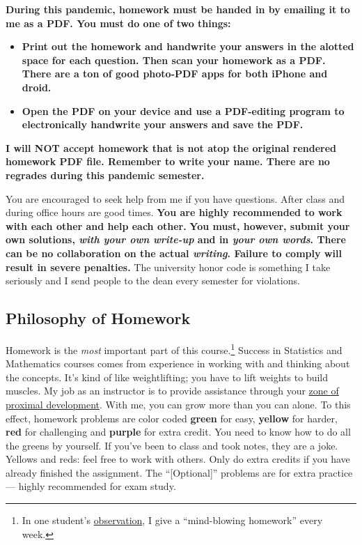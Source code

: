 \documentclass[12pt]{article}
\newcommand{\ingreen}[1]{\color{green}\textbf{#1} \color{black}}
\newcommand{\inyellow}[1]{\color{yellow}\textbf{#1} \color{black}}
\newcommand{\inred}[1]{\color{red}\textbf{#1} \color{black}}
\newcommand{\inpurple}[1]{\color{purple}\textbf{#1} \color{black}}
\newcommand{\qu}[1]{``#1''}
\begin{document}
\textbf{During this pandemic, homework must be handed in by emailing it to me as a PDF. You must do one of two things:}

\begin{itemize}
\item \textbf{Print out the homework and handwrite your answers in the alotted space for each question. Then scan your homework as a PDF. There are a ton of good photo-PDF apps for both iPhone and droid. }
\item \textbf{Open the PDF on your device and use a PDF-editing program to electronically handwrite your answers and save the PDF.}
\end{itemize}

\textbf{I will NOT accept homework that is not atop the original rendered homework PDF file. Remember to write your name. There are no regrades during this pandemic semester.}

You are encouraged to seek help from me if you have questions. After class and during office hours are good times. \ingreen{You are highly recommended to work with each other and help each other.} \inred{You must, however, submit your own solutions, \textit{with your own write-up} and in \textit{your own words}. There can be no collaboration on the actual \textit{writing}. Failure to comply will result in severe penalties.} The university honor code is something I take seriously and I send people to the dean every semester for violations.


\subsection*{Philosophy of Homework}


Homework is the \textit{most} important part of this course.\footnote{In one student's \href{http://www.ratemyprofessors.com/ShowRatings.jsp?tid=1951051}{observation}, I give a \qu{mind-blowing homework} every week.} Success in Statistics and Mathematics courses comes from experience in working with and thinking about the concepts. It's kind of like weightlifting; you have to lift weights to build muscles. My job as an instructor is to provide assistance through your \href{http://en.wikipedia.org/wiki/Zone_of_proximal_development}{zone of proximal development}. With me, you can grow more than you can alone. To this effect, homework problems are color coded \ingreen{green} for easy, \inyellow{yellow} for harder, \inred{red} for challenging and \inpurple{purple} for extra credit. You need to know how to do all the greens by yourself. If you've been to class and took notes, they are a joke. Yellows and reds: feel free to work with others. Only do extra credits if you have already finished the assignment. The \qu{[Optional]} problems are for extra practice --- highly recommended for exam study.
\end{document}
